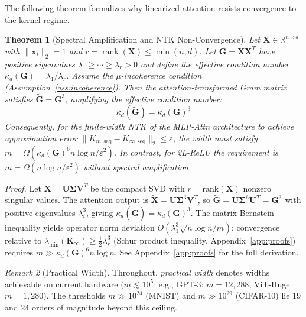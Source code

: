\documentclass{article}
\theoremstyle{plain}
\newtheorem{theorem}{Theorem}[section]
\theoremstyle{definition}
\theoremstyle{remark}
\newtheorem{remark}[theorem]{Remark}
\newcommand{\R}{\mathbb{R}}
\begin{document}
The following theorem formalizes why linearized attention resists convergence to the kernel regime.

\begin{theorem}[Spectral Amplification and NTK Non-Convergence]
\label{thm:cubic_conditioning}
Let $\mathbf{X} \in \R^{n \times d}$ with $\|\mathbf{x}_i\|_2 = 1$ and $r = \operatorname{rank}(\mathbf{X}) \leq \min(n,d)$. Let $\mathbf{G} = \mathbf{X}\mathbf{X}^T$ have positive eigenvalues $\lambda_1 \geq \cdots \geq \lambda_r > 0$ and define the effective condition number $\kappa_d(\mathbf{G}) = \lambda_1/\lambda_r$. Assume the $\mu$-incoherence condition (Assumption~\ref{ass:incoherence}). Then the attention-transformed Gram matrix satisfies $\tilde{\mathbf{G}} = \mathbf{G}^3$, amplifying the effective condition number:
\begin{equation}
\kappa_d(\tilde{\mathbf{G}}) = \kappa_d(\mathbf{G})^3
\end{equation}
Consequently, for the finite-width NTK of the MLP-Attn architecture to achieve approximation error $\|K_{m,\text{seq}} - K_{\infty,\text{seq}}\|_2 \leq \varepsilon$, the width must satisfy $m = \Omega(\kappa_d(\mathbf{G})^6 n\log n / \varepsilon^2)$. In contrast, for 2L-ReLU the requirement is $m = \Omega(n\log n/\varepsilon^2)$ without spectral amplification.
\end{theorem}

\emph{Proof.} Let $\mathbf{X} = \mathbf{U}\boldsymbol{\Sigma}\mathbf{V}^T$ be the compact SVD with $r = \mathrm{rank}(\mathbf{X})$ nonzero singular values. The attention output is $\tilde{\mathbf{X}} = \mathbf{U}\boldsymbol{\Sigma}^3\mathbf{V}^T$, so $\tilde{\mathbf{G}} = \mathbf{U}\boldsymbol{\Sigma}^6\mathbf{U}^T = \mathbf{G}^3$ with positive eigenvalues $\lambda_i^3$, giving $\kappa_d(\tilde{\mathbf{G}}) = \kappa_d(\mathbf{G})^3$. The matrix Bernstein inequality yields operator norm deviation $O(\lambda_1^3\sqrt{n\log n/m})$; convergence relative to $\lambda_{\min}^+(\mathbf{K}_\infty) \geq \tfrac{1}{2}\lambda_r^3$ (Schur product inequality, Appendix~\ref{app:proofs}) requires $m \gg \kappa_d(\mathbf{G})^6 n\log n$. See Appendix~\ref{app:proofs} for the full derivation.

\begin{remark}[Practical Width]
\label{rmk:practical_width}
Throughout, \emph{practical width} denotes widths achievable on current hardware ($m \lesssim 10^5$; e.g., GPT-3: $m = 12{,}288$, ViT-Huge: $m = 1{,}280$). The thresholds $m \gg 10^{24}$ (MNIST) and $m \gg 10^{29}$ (CIFAR-10) lie 19 and 24 orders of magnitude beyond this ceiling.
\end{remark}
\end{document}
